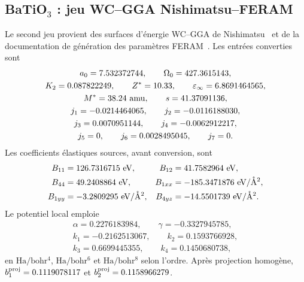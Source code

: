 \subsection{BaTiO$_3$ : jeu WC--GGA Nishimatsu--FERAM}

Le second jeu provient des surfaces d'énergie WC--GGA de
Nishimatsu~\cite{Nishimatsu2010} et de la documentation de génération des
paramètres FERAM~\cite{FERAMParameters}. Les entrées converties sont
\begin{equation}
\begin{gathered}
a_0=7.532372744,\qquad \Omega_0=427.3615143,\\
K_2=0.087822249,\qquad Z^*=10.33,\qquad
\varepsilon_\infty=6.8691464565,\\
M^*=38.24\ {\rm amu},\qquad s=41.37091136,\\
j_1=-0.0214464065,\qquad j_2=-0.0116188030,\\
j_3=0.0070951144,\qquad j_4=-0.0062912217,\\
j_5=0,\qquad j_6=0.0028495045,\qquad j_7=0 .
\end{gathered}
\label{eq:core_nish_input}
\end{equation}
Les coefficients élastiques sources, avant conversion, sont
\begin{equation}
\begin{aligned}
B_{11}&=126.7316715\ {\rm eV},&
B_{12}&=41.7582964\ {\rm eV},\\
B_{44}&=49.2408864\ {\rm eV},&
B_{1xx}&=-185.3471876\ {\rm eV/\mathring A^2},\\
B_{1yy}&=-3.2809295\ {\rm eV/\mathring A^2},&
B_{4yz}&=-14.5501739\ {\rm eV/\mathring A^2}.
\end{aligned}
\label{eq:core_nish_elastic_source}
\end{equation}
Le potentiel local emploie
\begin{equation}
\begin{gathered}
\alpha=0.2276183984,\qquad \gamma=-0.3327945785,\\
k_1=-0.2162513067,\qquad k_2=0.1593766928,\\
k_3=0.6699445355,\qquad k_4=0.1450680738,
\end{gathered}
\label{eq:core_nish_anharmonic}
\end{equation}
en $\mathrm{Ha/bohr^4}$, $\mathrm{Ha/bohr^6}$ et
$\mathrm{Ha/bohr^8}$ selon l'ordre. Après projection homogène,
$b_1^{\rm proj}=0.1119078117$ et $b_2^{\rm proj}=0.1158966279$.

